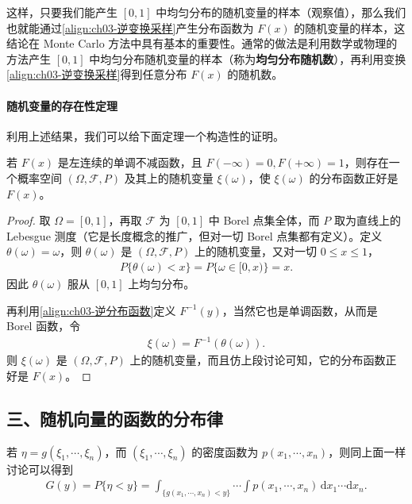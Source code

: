 \documentclass[../../main.tex]{subfiles}
\begin{document}
这样，只要我们能产生 $[0,1]$ 中均匀分布的随机变量的样本（观察值），那么我们也就能通过\eqref{align:ch03-逆变换采样}产生分布函数为 $F(x)$ 的随机变量的样本，这结论在 Monte Carlo 方法中具有基本的重要性。通常的做法是利用数学或物理的方法产生 $[0,1]$ 中均匀分布随机变量的样本（称为\textbf{均匀分布随机数}），再利用变换\eqref{align:ch03-逆变换采样}得到任意分布 $F(x)$ 的随机数。

\paragraph*{随机变量的存在性定理}利用上述结果，我们可以给下面定理一个构造性的证明。

\begin{theorem}[随机变量的存在性]\label{theorem:ch03-随机变量存在性}
若 $F(x)$ 是左连续的单调不减函数，且 $F(-\infty)=0,F(+\infty)=1$，则存在一个概率空间 $(\Omega,\mathscr{F},P)$ 及其上的随机变量 $\xi(\omega)$，使 $\xi(\omega)$ 的分布函数正好是 $F(x)$。
\end{theorem}

\begin{proof}
取 $\Omega=[0,1]$，再取 $\mathscr{F}$ 为 $[0,1]$ 中 Borel 点集全体，而 $P$ 取为直线上的 Lebesgue 测度（它是长度概念的推广，但对一切 Borel 点集都有定义）。定义 $\theta(\omega)=\omega$，则 $\theta(\omega)$ 是 $(\Omega,\mathscr{F},P)$ 上的随机变量，又对一切 $0\leqslant x\leqslant 1$，
\begin{align*}P\{\theta(\omega)<x\}=P\{\omega\in[0,x)\}=x.\end{align*}
因此 $\theta(\omega)$ 服从 $[0,1]$ 上均匀分布。

再利用\eqref{align:ch03-逆分布函数}定义 $F^{-1}(y)$，当然它也是单调函数，从而是 Borel 函数，令
\begin{align*}\xi(\omega)=F^{-1}(\theta(\omega)).\end{align*}
则 $\xi(\omega)$ 是 $(\Omega,\mathscr{F},P)$ 上的随机变量，而且仿上段讨论可知，它的分布函数正好是 $F(x)$。
\end{proof}

\subsection*{三、随机向量的函数的分布律}

若 $\eta=g(\xi_1,\cdots,\xi_n)$，而 $(\xi_1,\cdots,\xi_n)$ 的密度函数为 $p(x_1,\cdots,x_n)$，则同上面一样讨论可以得到
\begin{align}
G(y)=P\{\eta<y\}=\int_{\{g(x_1,\cdots,x_n)<y\}}\cdots\int p(x_1,\cdots,x_n)\,\mathrm{d}x_1\cdots\mathrm{d}x_n.\label{align:ch03-向量函数分布}
\end{align}
\end{document}
